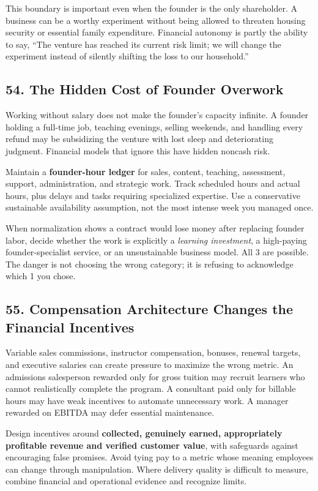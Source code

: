This boundary is important even when the founder is the only shareholder. A business can be a worthy experiment without being allowed to threaten housing security or essential family expenditure. Financial autonomy is partly the ability to say, ``The venture has reached its current risk limit; we will change the experiment instead of silently shifting the loss to our household.''

\subsection*{54. The Hidden Cost of Founder Overwork}

Working without salary does not make the founder's capacity infinite. A founder holding a full-time job, teaching evenings, selling weekends, and handling every refund may be subsidizing the venture with lost sleep and deteriorating judgment. Financial models that ignore this have hidden noncash risk.

Maintain a \textbf{founder-hour ledger} for sales, content, teaching, assessment, support, administration, and strategic work. Track scheduled hours and actual hours, plus delays and tasks requiring specialized expertise. Use a conservative sustainable availability assumption, not the most intense week you managed once.

When normalization shows a contract would lose money after replacing founder labor, decide whether the work is explicitly a \emph{learning investment}, a high-paying founder-specialist service, or an unsustainable business model. All 3 are possible. The danger is not choosing the wrong category; it is refusing to acknowledge which 1 you chose.

\subsection*{55. Compensation Architecture Changes the Financial Incentives}

Variable sales commissions, instructor compensation, bonuses, renewal targets, and executive salaries can create pressure to maximize the wrong metric. An admissions salesperson rewarded only for gross tuition may recruit learners who cannot realistically complete the program. A consultant paid only for billable hours may have weak incentives to automate unnecessary work. A manager rewarded on EBITDA may defer essential maintenance.

Design incentives around \textbf{collected, genuinely earned, appropriately profitable revenue and verified customer value}, with safeguards against encouraging false promises. Avoid tying pay to a metric whose meaning employees can change through manipulation. Where delivery quality is difficult to measure, combine financial and operational evidence and recognize limits.

